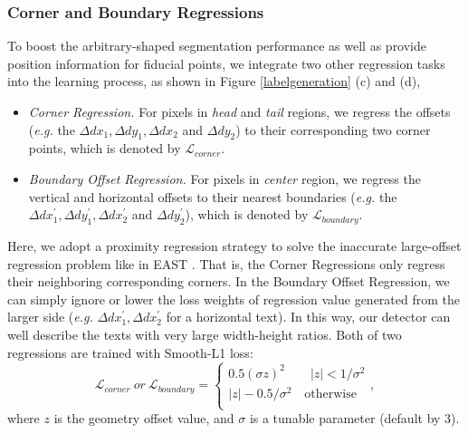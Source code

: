 \documentclass[letterpaper]{article} \usepackage{aaai20}  \usepackage{times}  \usepackage{helvet} \usepackage{courier}  \usepackage[hyphens]{url}  \usepackage{graphicx} \urlstyle{rm} \def\UrlFont{\rm}  \usepackage{graphicx}  \frenchspacing  \setlength{\pdfpagewidth}{8.5in}  \setlength{\pdfpageheight}{11in}  \usepackage{amsmath}
\begin{document}
\subsubsection{Corner and Boundary Regressions}
To boost the arbitrary-shaped segmentation performance as well as provide position information for fiducial points, we integrate two other regression tasks into the learning process, as shown in Figure \ref{labelgeneration} (c) and (d),
\begin{itemize}
\item \emph{Corner Regression.}
For pixels in \emph{head} and \emph{tail} regions, we regress the offsets (\emph{e.g.} the $\Delta dx_1, \Delta dy_1, \Delta dx_2$ and $\Delta dy_2$) to their corresponding two corner points, which is denoted by $\mathcal{L}_{corner}$.

\item \emph{Boundary Offset Regression.}
For pixels in \emph{center} region, we regress the vertical and horizontal offsets to their nearest boundaries (\emph{e.g.} the $\Delta dx_1^\prime, \Delta dy_1^\prime, \Delta dx_2^\prime$ and $\Delta dy_2^\prime$), which is denoted by $\mathcal{L}_{boundary}$.
\end{itemize}
Here, we adopt a proximity regression strategy to solve the inaccurate large-offset regression problem like in EAST \cite{zhou2017east}.
That is, the Corner Regressions only regress their neighboring corresponding corners.
In the Boundary Offset Regression, we can simply ignore or lower the loss weights of regression value generated from the larger side (\emph{e.g.} $\Delta dx_1^\prime, \Delta dx_2^\prime$ for a horizontal text). In this way, our detector can well describe the texts with very large width-height ratios.
Both of two regressions are trained with Smooth-L1 loss:
\begin{equation}
\mathcal{L}_{corner} ~or~ \mathcal{L}_{boundary} = \left\{
\begin{array}{lr}
0.5(\sigma z)^2       \qquad   |z| < 1/\sigma^{2} \\
 |z| - 0.5/\sigma^2   \quad    \text{otherwise} \\
\end{array}
\right. ,
\end{equation}
where $z$ is the geometry offset value, and $\sigma$ is a tunable parameter (default by 3).
\end{document}
